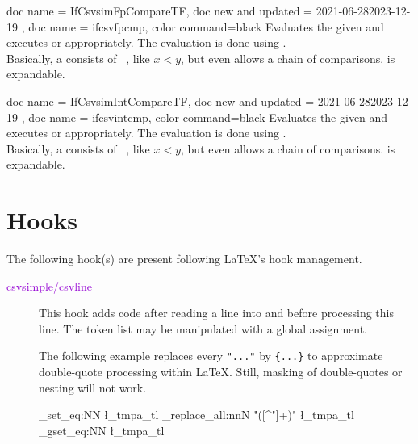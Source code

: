 \documentclass[a4paper,11pt]{ltxdoc}
\begin{document}
\begin{docCommands}[
      doc parameter = \marg{floating point comparison}\marg{true}\marg{false}
    ]
  {
    { doc name = IfCsvsimFpCompareTF, doc new and updated = {2021-06-28}{2023-12-19} },
    { doc name = ifcsvfpcmp, color command=black }
  }
  Evaluates the given 
  and executes  or  appropriately.
  The evaluation is done using .\\
  Basically, a  consists of
  \mbox{  },
  like \mbox{$x<y$}, but  even allows a chain of comparisons.
   is expandable.
\end{docCommands}


\begin{docCommands}[
      doc parameter = \marg{integer comparison}\marg{true}\marg{false}
    ]
  {
    { doc name = IfCsvsimIntCompareTF, doc new and updated = {2021-06-28}{2023-12-19} },
    { doc name = ifcsvintcmp, color command=black }
  }
  Evaluates the given 
  and executes  or  appropriately.
  The evaluation is done using .\\
  Basically, a  consists of
  \mbox{  },
  like \mbox{$x<y$}, but  even allows a chain of comparisons.
   is expandable.
\end{docCommands}



\clearpage
\section{Hooks}\label{sec:hooks}%
The following hook(s) are present following \LaTeX's hook management.

\begin{description}
\item[\textcolor{DarkViolet}{\ttfamily csvsimple/csvline}]
  This hook adds code after reading
  a line into  and before processing this line.
  The token list  may be manipulated with a global assignment.\par
  The following example replaces every \verb+"..."+ by \verb+{...}+ to
  approximate double-quote processing within \LaTeX. Still, masking of double-quotes
  or nesting will not work.
\begin{dispListing}
  {
    \tl_set_eq:NN \l_tmpa_tl \csvline
    \regex_replace_all:nnN { "([^"]+)" } { {\1} } \l_tmpa_tl
    \tl_gset_eq:NN \csvline \l_tmpa_tl
  }
\end{dispListing}

\end{description}
\end{document}
